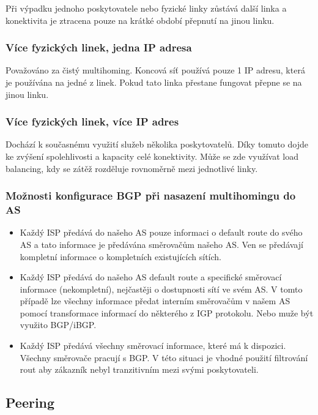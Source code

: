 Při výpadku jednoho poskytovatele nebo fyzické linky zůstává další linka a konektivita je ztracena pouze na krátké období přepnutí na jinou linku.

\subsubsection{Více fyzických linek, jedna IP adresa }

Považováno za čistý multihoming.
Koncová síť používá pouze 1 IP adresu, která je používána na jedné z linek.
Pokud tato linka přestane fungovat přepne se na jinou linku.

\subsubsection{Více fyzických linek, více IP adres}

Dochází k současnému využití služeb několika poskytovatelů.
Díky tomuto dojde ke zvýšení spolehlivosti a kapacity celé konektivity.
Může se zde využívat load balancing, kdy se zátěž rozděluje rovnoměrně mezi jednotlivé linky.

\subsubsection{Možnosti konfigurace BGP při nasazení multihomingu do AS}
\begin{itemize}[noitemsep]
        \item Každý ISP předává do našeho AS pouze informaci o default route do svého AS a tato informace je předávána směrovačům našeho AS.
        Ven se předávají kompletní informace o kompletních existujících sítích.
        \item Každý ISP předává do našeho AS default route a specifické směrovací informace (nekompletní), nejčastěji o dostupnosti sítí ve svém AS.
        V tomto případě lze všechny informace předat interním směrovačům v našem AS pomocí transformace informací do některého z IGP protokolu.
        Nebo muže být využito BGP/iBGP.
        \item Každý ISP předává všechny směrovací informace, které má k dispozici.
        Všechny směrovače pracují s BGP.
        V této situaci je vhodné použití filtrování rout aby zákazník nebyl tranzitivním mezi svými poskytovateli.
\end{itemize}

\subsection{Peering}

